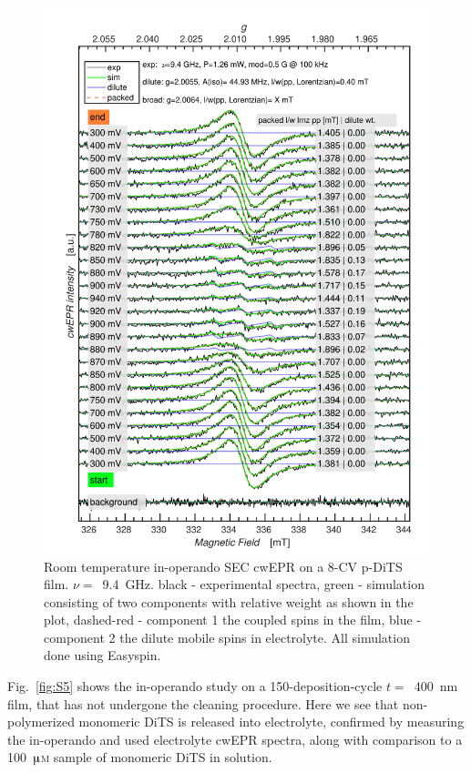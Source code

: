 \begin{figure}[h!]
\centering
\includegraphics[width=1\textwidth]{./operando_epr/figures/Figure_S4}
\caption{Room temperature in-operando SEC cwEPR on a 8-CV p-DiTS film. $\nu=$~9.4~GHz. black - experimental spectra, green - simulation consisting of two components with relative weight as shown in the plot, dashed-red - component 1 the coupled spins in the film, blue - component 2 the dilute mobile spins in electrolyte. All simulation done using Easyspin.\cite{Stoll2006}}
\label{fig:S4}
\end{figure}


Fig.~\ref{fig:S5} shows the in-operando study on a 150-deposition-cycle $t =$~400~nm film, that has not undergone the cleaning procedure. Here we see that non-polymerized monomeric DiTS is released into electrolyte, confirmed by measuring the in-operando and used electrolyte cwEPR spectra, along with comparison to a 100~$\muup$\textsc{m} sample of monomeric DiTS in solution.

